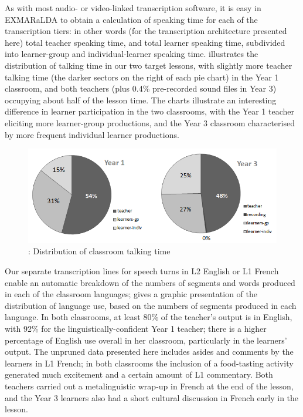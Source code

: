\documentclass[output=paper,colorlinks,citecolor=brown,modfonts,nonflat]{../langscibook}
\begin{document}
As with most audio- or video-linked transcription software, it is easy in EXMARaLDA to obtain a calculation of speaking time for each of the transcription tiers: in other words (for the transcription architecture presented here) total teacher speaking time, and total learner speaking time, subdivided into learner-group and individual-learner speaking time.  illustrates the distribution of talking time in our two target lessons, with slightly more teacher talking time (the darker sectors on the right of each pie chart) in the Year 1 classroom, and both teachers (plus 0.4\% pre-recorded sound files in Year 3) occupying about half of the lesson time. The charts illustrate an interesting difference in learner participation in the two classrooms, with the Year 1 teacher eliciting more learner-group productions, and the Year 3 classroom characterised by more frequent individual learner productions.

\begin{figure}
\caption{\label{fig:hilton:2}: Distribution of classroom talking time}
\includegraphics[width=\textwidth]{figures/hilton-img002.png}
\end{figure}

Our separate transcription lines for speech turns in L2 English or L1 French enable an automatic breakdown of the numbers of segments and words produced in each of the classroom languages;  gives a graphic presentation of the distribution of language use, based on the numbers of segments produced in each language. In both classrooms, at least 80\% of the teacher’s output is in English, with 92\% for the linguistically-confident Year 1 teacher; there is a higher percentage of English use overall in her classroom, particularly in the learners’ output. The unpruned data presented here includes asides and comments by the learners in L1 French; in both classrooms the inclusion of a food-tasting activity generated much excitement and a certain amount of L1 commentary. Both teachers carried out a metalinguistic wrap-up in French at the end of the lesson, and the Year 3 learners also had a short cultural discussion in French early in the lesson.
\end{document}
